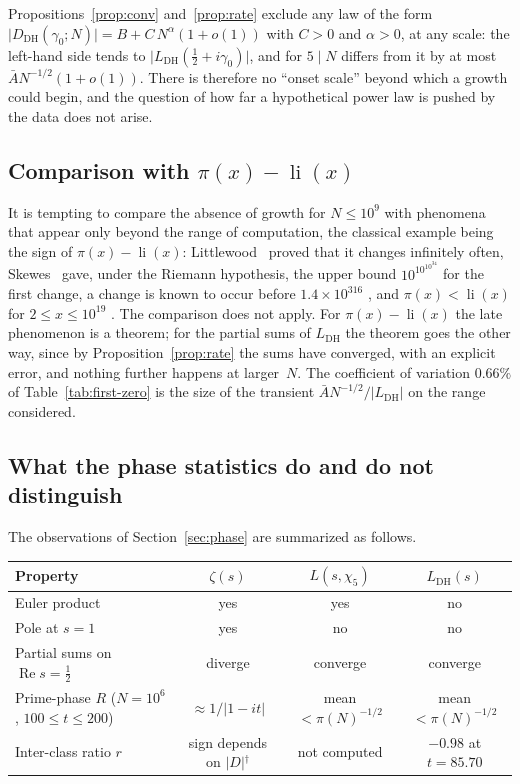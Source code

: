 \documentclass[11pt]{amsart}
\theoremstyle{definition}
\theoremstyle{remark}
\renewcommand{\DH}{\mathrm{DH}}
\newcommand{\abs}[1]{\lvert #1 \rvert}
\newcommand{\re}{\operatorname{Re}}
\newcommand{\Abar}{\bar A}
\DeclareMathOperator{\li}{li}
\begin{document}
Propositions~\ref{prop:conv} and~\ref{prop:rate} exclude any law of the form
$\abs{D_{\DH}(\gamma_0;N)}=B+C\,N^{\alpha}(1+o(1))$ with $C>0$ and
$\alpha>0$, at any scale: the left-hand side tends to
$\abs{L_{\DH}(\tfrac12+i\gamma_0)}$, and for $5\mid N$ differs from it by at
most $\Abar N^{-1/2}(1+o(1))$.
There is therefore no ``onset scale'' beyond which a growth could begin,
and the question of how far a hypothetical power law is pushed by the data
does not arise.

\subsection{Comparison with $\pi(x)-\li(x)$}

It is tempting to compare the absence of growth for $N\le10^9$ with
phenomena that appear only beyond the range of computation, the classical
example being the sign of $\pi(x)-\li(x)$: Littlewood~\cite{Littlewood1914}
proved that it changes infinitely often, Skewes~\cite{Skewes1933} gave,
under the Riemann hypothesis, the upper bound $10^{10^{10^{34}}}$ for the
first change, a change is known to occur before $1.4\times10^{316}$
\cite{BaysHudson2000}, and $\pi(x)<\li(x)$ for $2\le x\le10^{19}$
\cite{Buthe2018}.  The comparison does not apply.  For $\pi(x)-\li(x)$ the
late phenomenon is a theorem; for the partial sums of $L_{\DH}$ the
theorem goes the other way, since by Proposition~\ref{prop:rate} the sums
have converged, with an explicit error, and nothing further happens at
larger~$N$.  The coefficient of variation $0.66\%$ of
Table~\ref{tab:first-zero} is the size of the transient
$\Abar N^{-1/2}/\abs{L_{\DH}}$ on the range considered.

\subsection{What the phase statistics do and do not distinguish}

The observations of Section~\ref{sec:phase} are summarized as follows.

\begin{center}
\small
\begin{tabular}{@{}lccc@{}}
\toprule
Property & $\zeta(s)$ & $L(s,\chi_5)$ & $L_{\DH}(s)$ \\
\midrule
Euler product        & yes & yes & no \\
Pole at $s=1$        & yes & no & no \\
Partial sums on $\re s=\tfrac12$ & diverge & converge & converge \\
Prime-phase $R$ ($N=10^6$, $100\le t\le200$) & $\approx1/\abs{1-it}$ &
  mean $<\pi(N)^{-1/2}$ & mean $<\pi(N)^{-1/2}$ \\
Inter-class ratio $r$ & sign depends on $\abs D$$^\dagger$ & not computed &
  $-0.98$ at $t=85.70$ \\
\bottomrule
\end{tabular}
\end{center}
\end{document}
